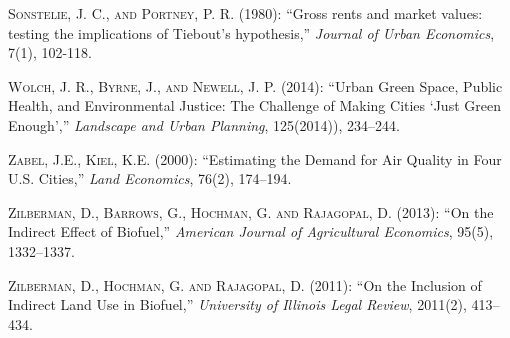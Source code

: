 \documentclass[ecta,nameyear,draft]{econsocart}
\theoremstyle{plain}
\theoremstyle{remark}
\begin{document}
\begin{thebibliography}{}
\textsc{Sonstelie, J. C., and Portney, P. R.} (1980):
``Gross rents and market values: testing the implications of Tiebout's hypothesis,''
\textit{Journal of Urban Economics}, 7(1), 102-118.
\endbibitem


\textsc{Wolch, J. R., Byrne, J., and Newell, J. P.} (2014):
``Urban Green Space, Public Health, and Environmental Justice: The Challenge of Making Cities ‘Just Green Enough’,''
\textit{Landscape and Urban Planning}, 125(2014)), 234--244.
\endbibitem



\textsc{Zabel, J.E., Kiel, K.E.} (2000):
``Estimating the Demand for Air Quality in Four U.S. Cities,''
\textit{Land Economics}, 76(2), 174--194.
\endbibitem

\textsc{Zilberman, D., Barrows, G., Hochman, G. and Rajagopal, D.} (2013):
``On the Indirect Effect of Biofuel,''
\textit{American Journal of Agricultural Economics}, 95(5), 1332--1337.
\endbibitem

\textsc{Zilberman, D., Hochman, G. and Rajagopal, D.} (2011):
``On the Inclusion of Indirect Land Use in Biofuel,''
\textit{University of Illinois Legal Review}, 2011(2), 413--434.
\endbibitem

%
%
%
%
%
\end{thebibliography}
\end{document}
